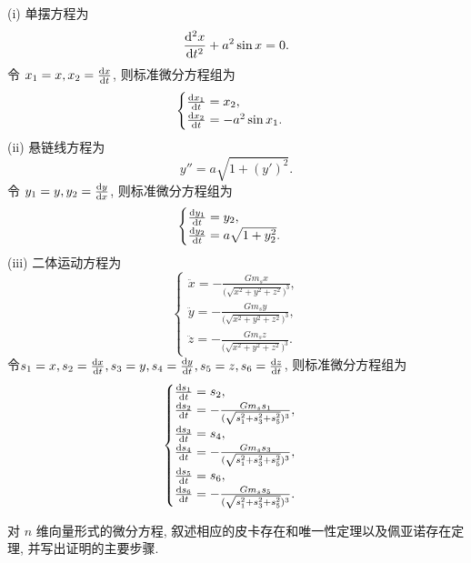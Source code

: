 \begin{solve} 
  (i) 单摆方程为
  \[\frac{\mathop{}\!\mathrm{d}^2x}{\mathop{}\!\mathrm{d} t^2}+a^2\sin x=0.\]
  令 $x_1=x,x_2=\frac{\mathop{}\!\mathrm{d} x}{\mathop{}\!\mathrm{d} t}$, 则标准微分方程组为
  \[\begin{cases}
  \frac{\mathop{}\!\mathrm{d} x_1}{\mathop{}\!\mathrm{d} t}=x_2, \\
  \frac{\mathop{}\!\mathrm{d} x_2}{\mathop{}\!\mathrm{d} t}=-a^2\sin x_1.
  \end{cases}\]
  (ii) 悬链线方程为
  \[y''=a\sqrt{1+(y')^2}.\]
  令 $y_1=y,y_2=\frac{\mathop{}\!\mathrm{d} y}{\mathop{}\!\mathrm{d} x}$, 则标准微分方程组为
  \[\begin{cases}
  \frac{\mathop{}\!\mathrm{d} y_1}{\mathop{}\!\mathrm{d} t}=y_2, \\
  \frac{\mathop{}\!\mathrm{d} y_2}{\mathop{}\!\mathrm{d} t}=a\sqrt{1+y_2^2}.
  \end{cases}\]
  (iii) 二体运动方程为
  \[\begin{cases}
  \ddot{x} = -\frac{Gm_sx}{\bigl(\sqrt{x^2+y^2+z^2}\bigr)^3}, \\
  \ddot{y} = -\frac{Gm_sy}{\bigl(\sqrt{x^2+y^2+z^2}\bigr)^3}, \\
  \ddot{z} = -\frac{Gm_sz}{\bigl(\sqrt{x^2+y^2+z^2}\bigr)^3}.
  \end{cases}\]
  令$s_1=x,s_2=\frac{\mathop{}\!\mathrm{d} x}{\mathop{}\!\mathrm{d} t},s_3=y,s_4=\frac{\mathop{}\!\mathrm{d} y}{\mathop{}\!\mathrm{d} t},s_5=z,s_6=\frac{\mathop{}\!\mathrm{d} z}{\mathop{}\!\mathrm{d} t}$, 则标准微分方程组为
  \[\begin{cases}
  \frac{\diff s_1}{\diff t} = s_2, \\
  \frac{\diff s_2}{\diff t} = -\frac{Gm_ss_1}{(\sqrt{s_1^2+s_3^2+s_5^2})^3}, \\
  \frac{\diff s_3}{\diff t} = s_4,\\
  \frac{\diff s_4}{\diff t} = -\frac{Gm_ss_3}{(\sqrt{s_1^2+s_3^2+s_5^2})^3}, \\
  \frac{\diff s_5}{\diff t} = s_6,\\
  \frac{\diff s_6}{\diff t} = -\frac{Gm_ss_5}{(\sqrt{s_1^2+s_3^2+s_5^2})^3}.
  \end{cases}\]
\end{solve}



\begin{exercise}
  对 $n$ 维向量形式的微分方程, 叙述相应的皮卡存在和唯一性定理以及佩亚诺存在定理, 并写出证明的主要步骤.
\end{exercise}

